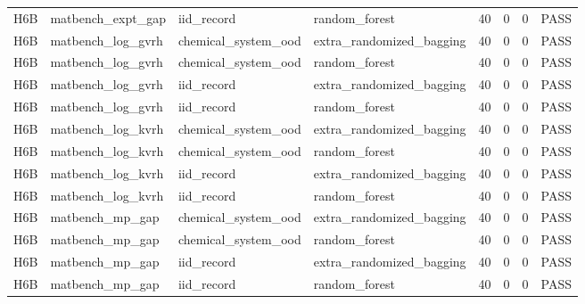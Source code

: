 \documentclass[10pt]{article}
\begin{document}
\begin{landscape}
\begin{longtable}{L{.32in}L{1.05in}L{1.2in}L{1.3in}L{.42in}L{.42in}L{.42in}L{.48in}}
H6B & matbench\_\allowbreak{}expt\_\allowbreak{}gap & iid\_\allowbreak{}record & random\_\allowbreak{}forest & 40 & 0 & 0 & PASS\\
H6B & matbench\_\allowbreak{}log\_\allowbreak{}gvrh & chemical\_\allowbreak{}system\_\allowbreak{}ood & extra\_\allowbreak{}randomized\_\allowbreak{}bagging & 40 & 0 & 0 & PASS\\
H6B & matbench\_\allowbreak{}log\_\allowbreak{}gvrh & chemical\_\allowbreak{}system\_\allowbreak{}ood & random\_\allowbreak{}forest & 40 & 0 & 0 & PASS\\
H6B & matbench\_\allowbreak{}log\_\allowbreak{}gvrh & iid\_\allowbreak{}record & extra\_\allowbreak{}randomized\_\allowbreak{}bagging & 40 & 0 & 0 & PASS\\
H6B & matbench\_\allowbreak{}log\_\allowbreak{}gvrh & iid\_\allowbreak{}record & random\_\allowbreak{}forest & 40 & 0 & 0 & PASS\\
H6B & matbench\_\allowbreak{}log\_\allowbreak{}kvrh & chemical\_\allowbreak{}system\_\allowbreak{}ood & extra\_\allowbreak{}randomized\_\allowbreak{}bagging & 40 & 0 & 0 & PASS\\
H6B & matbench\_\allowbreak{}log\_\allowbreak{}kvrh & chemical\_\allowbreak{}system\_\allowbreak{}ood & random\_\allowbreak{}forest & 40 & 0 & 0 & PASS\\
H6B & matbench\_\allowbreak{}log\_\allowbreak{}kvrh & iid\_\allowbreak{}record & extra\_\allowbreak{}randomized\_\allowbreak{}bagging & 40 & 0 & 0 & PASS\\
H6B & matbench\_\allowbreak{}log\_\allowbreak{}kvrh & iid\_\allowbreak{}record & random\_\allowbreak{}forest & 40 & 0 & 0 & PASS\\
H6B & matbench\_\allowbreak{}mp\_\allowbreak{}gap & chemical\_\allowbreak{}system\_\allowbreak{}ood & extra\_\allowbreak{}randomized\_\allowbreak{}bagging & 40 & 0 & 0 & PASS\\
H6B & matbench\_\allowbreak{}mp\_\allowbreak{}gap & chemical\_\allowbreak{}system\_\allowbreak{}ood & random\_\allowbreak{}forest & 40 & 0 & 0 & PASS\\
H6B & matbench\_\allowbreak{}mp\_\allowbreak{}gap & iid\_\allowbreak{}record & extra\_\allowbreak{}randomized\_\allowbreak{}bagging & 40 & 0 & 0 & PASS\\
H6B & matbench\_\allowbreak{}mp\_\allowbreak{}gap & iid\_\allowbreak{}record & random\_\allowbreak{}forest & 40 & 0 & 0 & PASS\\
\bottomrule
\end{longtable}
\endgroup

\end{landscape}
\end{document}
